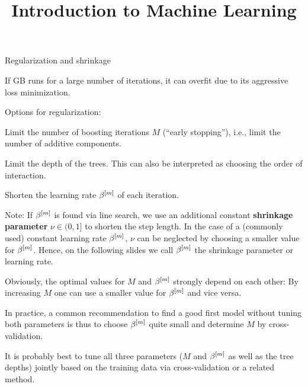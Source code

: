  






\newcommand{\titlefigure}{figure_man/spam-detection.png}
\newcommand{\learninggoals}{
  \item Introducing the three main regularization options: number of iterations, tree depth and shrinkage
  \item Examples how regularization parameters influence model fit
}

\title{Introduction to Machine Learning}
\date{}






\begin{vbframe}{Regularization and shrinkage}

If GB runs for a large number of iterations, it can overfit due to its aggressive loss
minimization.

\begin{blocki}{Options for regularization:}
\item Limit the number of boosting iterations $M$ (\enquote{early stopping}), i.e., limit the number of additive components.
\item Limit the depth of the trees. This can also be interpreted as choosing the order of interaction.
\item Shorten the learning rate $\beta^{[m]}$ of each iteration.
\end{blocki}


Note: If $\beta^{[m]}$ is found via line search, we use an additional constant \textbf{shrinkage parameter} $\nu \in (0,1]$ to shorten the step length.
In the case of a (commonly used) constant learning rate $\beta^{[m]}$, $\nu$ can be neglected by choosing a smaller value for $\beta^{[m]}$.
Hence, on the following slides we call $\beta^{[m]}$ the shrinkage parameter or learning rate.


\framebreak

Obviously, the optimal values for $M$ and $\beta^{[m]}$ strongly depend on each other:
By increasing $M$ one can use a smaller value for $\beta^{[m]}$ and vice versa.

\lz

In practice, a common recommendation to find a good first model without tuning both parameters is thus to choose $\beta^{[m]}$ quite small and determine $M$ by cross-validation. 

\lz

It is probably best to tune all three parameters ($M$ and $\beta^{[m]}$ as well as 
the tree depths) jointly based on the training data
via cross-validation or a related method.

\end{vbframe}

